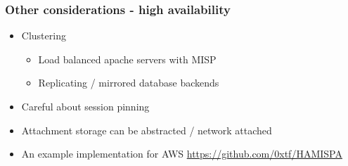 \begin{frame}
\frametitle{Other considerations - high availability}
    \begin{itemize}
        \item Clustering
        \begin{itemize}
            \item Load balanced apache servers with MISP
            \item Replicating / mirrored database backends
        \end{itemize}
        \item Careful about session pinning
        \item Attachment storage can be abstracted / network attached
        \item An example implementation for AWS \url{https://github.com/0xtf/HAMISPA}
    \end{itemize}
\end{frame}



